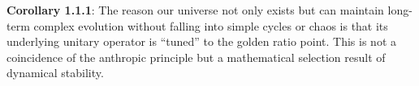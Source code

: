 \textbf{Corollary 1.1.1}:
The reason our universe not only exists but can maintain long-term complex evolution without falling into simple cycles or chaos is that its underlying unitary operator is ``tuned'' to the golden ratio point. This is not a coincidence of the anthropic principle but a mathematical selection result of dynamical stability.
